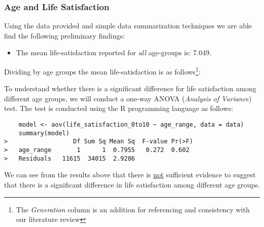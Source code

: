 \documentclass[12pt, a4paper]{article}
\begin{document}
\subsubsection*{Age and Life Satisfaction}
\par Using the data provided and simple data summarization techniques we are able find the following preliminary findings:
\begin{itemize}
    \item The mean life-satisfaction reported for \textit{all} age-groups is:  7.049.
\end{itemize}
Dividing by age groups the mean life-satisfaction is as follows\footnote{The \textit{Generation} column is an addition for referencing and consistency with our literature review}:
\begin{table}[h]
\end{table}
\par To understand whether there is a significant difference for life satisfaction among different age groups, we will conduct a one-way ANOVA (\textit{Analysis of Variance}) test.
The test is conducted using the R programming language as follows:

\begin{verbatim}
    model <- aov(life_satisfaction_0to10 ~ age_range, data = data)
    summary(model)  
>                  Df Sum Sq Mean Sq  F-value Pr(>F)
>   age_range       1      1  0.7955   0.272  0.602
>   Residuals   11615  34015  2.9286
\end{verbatim}
We can see from the results above that there is \underline{not} sufficient evidence to suggest that there is a significant difference in life satisfaction among different age groups.
\end{document}
